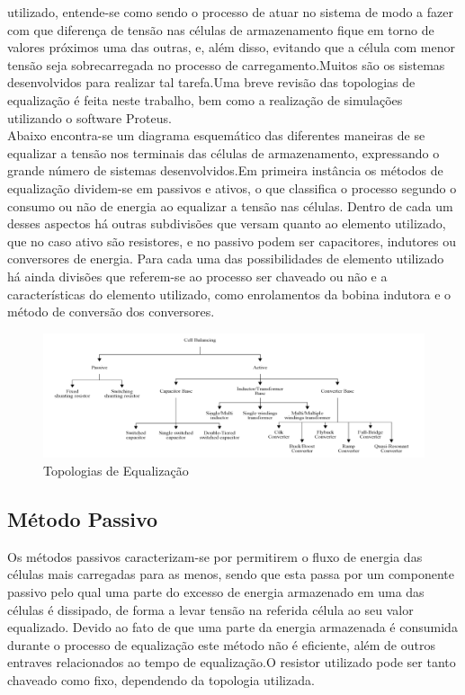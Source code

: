 \documentclass[11pt, a4paper, oneside]{article}
\begin{document}
utilizado, entende-se como sendo o processo de atuar no sistema de modo a fazer
com que diferença de tensão nas células de armazenamento fique em torno de
valores próximos uma das outras, e, além disso, evitando que a célula com menor
tensão seja sobrecarregada no processo de carregamento.Muitos são os
sistemas desenvolvidos para realizar tal tarefa.Uma breve revisão das topologias
de equalização é feita neste trabalho, bem como a realização de simulações
utilizando o software Proteus.\\
Abaixo encontra-se um diagrama esquemático das diferentes maneiras de
se equalizar a tensão nos terminais das células de armazenamento, expressando o
grande número de sistemas desenvolvidos.Em primeira instância os
métodos de equalização dividem-se em passivos e ativos, o que classifica o
processo segundo o consumo ou não de energia ao equalizar a tensão nas células.
Dentro de cada um desses aspectos há outras subdivisões que versam quanto ao
elemento utilizado, que no caso ativo são resistores, e no passivo podem ser
capacitores, indutores ou conversores de energia. Para cada uma das
possibilidades de elemento utilizado há ainda divisões que referem-se ao processo
ser chaveado ou não e a características do elemento utilizado, como enrolamentos
da bobina indutora e o método de conversão dos conversores.

\begin{figure}[h!]
\label{fig:estrutura_do_doutorado}
\centering
\includegraphics[width=1\linewidth]{topologia_de_equalizacao}
\caption{Topologias de Equalização \cite{energy_figure}}
\end{figure}

\subsection{Método Passivo}
Os métodos passivos caracterizam-se por permitirem o fluxo de energia das
células mais carregadas para as menos, sendo que esta passa por um componente
passivo pelo qual uma parte do excesso de energia armazenado em uma das
células é dissipado, de forma a levar tensão na referida célula ao seu valor
equalizado. Devido ao fato de que uma parte da energia armazenada é consumida
durante o processo de equalização este método não é eficiente, além de outros
entraves relacionados ao tempo de equalização.O resistor utilizado pode ser tanto
chaveado como fixo, dependendo da topologia utilizada.
\end{document}
